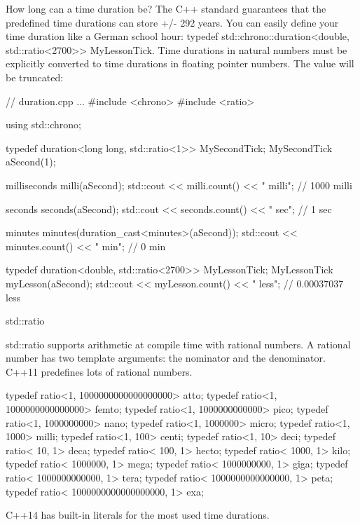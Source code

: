 How long can a time duration be? The C++ standard guarantees that the predefined time durations can store +/- 292 years. You can easily define your time duration like a German school hour: typedef std::chrono::duration<double, std::ratio<2700>> MyLessonTick. Time durations in natural numbers must be explicitly converted to time durations in floating pointer numbers. The value will be truncated:


\begin{cpp}
// duration.cpp
...
#include <chrono>
#include <ratio>

using std::chrono;

typedef duration<long long, std::ratio<1>> MySecondTick;
MySecondTick aSecond(1);

milliseconds milli(aSecond);
std::cout << milli.count() << " milli"; // 1000 milli

seconds seconds(aSecond);
std::cout << seconds.count() << " sec"; // 1 sec

minutes minutes(duration_cast<minutes>(aSecond));
std::cout << minutes.count() << " min"; // 0 min

typedef duration<double, std::ratio<2700>> MyLessonTick;
MyLessonTick myLesson(aSecond);
std::cout << myLesson.count() << " less"; // 0.00037037 less
\end{cpp}

\begin{myNotic}{std::ratio}
	
std::ratio supports arithmetic at compile time with rational numbers. A rational number has two template arguments: the nominator and the denominator. C++11 predefines lots of rational numbers.
	
\begin{cpp}
typedef ratio<1, 1000000000000000000> atto;
typedef ratio<1, 1000000000000000> femto;
typedef ratio<1, 1000000000000> pico;
typedef ratio<1, 1000000000> nano;
typedef ratio<1, 1000000> micro;
typedef ratio<1, 1000> milli;
typedef ratio<1, 100> centi;
typedef ratio<1, 10> deci;
typedef ratio< 10, 1> deca;
typedef ratio< 100, 1> hecto;
typedef ratio< 1000, 1> kilo;
typedef ratio< 1000000, 1> mega;
typedef ratio< 1000000000, 1> giga;
typedef ratio< 1000000000000, 1> tera;
typedef ratio< 1000000000000000, 1> peta;
typedef ratio< 1000000000000000000, 1> exa;
\end{cpp}
	
\end{myNotic}

C++14 has built-in literals for the most used time durations.

